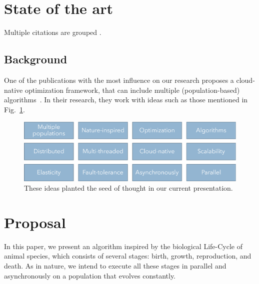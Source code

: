 \documentclass[runningheads]{llncs}
\begin{document}
\section{State of the art}

Multiple citations are grouped \cite{valdez2021container,krejca2020lower,witt2019upper,merelo2016nodio,merelo2016performance,fortin2012deap,stanley2002evolving}.


\subsection{Background}

One of the publications with the most influence on our research proposes a
cloud-native optimization framework, that can include multiple
(population-based) algorithms~\cite{valdez2021container}. In their research, they work with ideas such
as those mentioned in Fig.~\ref{fig1}.

\begin{figure}
    \includegraphics[width=\textwidth]{img/fig1_background.pdf}
    \caption{These ideas planted the seed of thought in our current presentation.} \label{fig1}
    \end{figure}

\section{Proposal} 

In this paper, we present an algorithm inspired by the biological Life-Cycle of
animal species, which consists of several stages: birth, growth, reproduction,
and death. As in nature, we intend to execute all these stages in parallel and
asynchronously on a population that evolves constantly.
\end{document}
